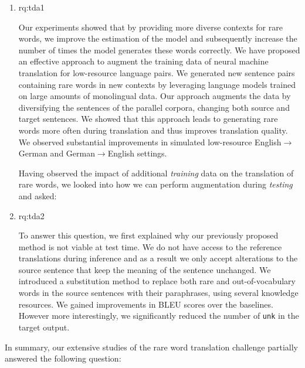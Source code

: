 \begin{enumerate}[label=\textbf{RQ2.\arabic* },wide = 0pt, leftmargin=2em]
\setlength\itemsep{1em}
\item \acl{rq:tda1}

\medskip

\noindent  Our experiments showed that by providing more diverse contexts for rare words, we improve the estimation of the model and subsequently increase the number of times the model generates these words correctly. 
We have proposed an effective approach to augment the training data of neural machine translation for low-resource language pairs. 
We generated new sentence pairs containing rare words in new contexts by leveraging language models trained on large amounts of monolingual data.
Our approach augments the data by diversifying the sentences of the parallel corpora, changing both source and target sentences.
We showed that this approach leads to generating rare words more often during translation and thus improves translation quality. 
We observed substantial improvements in simulated low-resource English$\rightarrow$German and German$\rightarrow$English settings.

 \noindent Having observed the impact of additional \textit{training} data on the translation of rare words, we looked into how we can perform augmentation during \textit{testing} and asked: 

\item \acl{rq:tda2}

\medskip

\noindent To answer this question, we first explained why our previously proposed method is not viable at test time.  
We do not have access to the reference translations during inference and as a result we only accept alterations to the source sentence that keep the meaning of the sentence unchanged.
We introduced a substitution method to replace both rare and out-of-vocabulary words in the source sentences with their paraphrases, using several knowledge resources.
We gained improvements in BLEU scores over the baselines.
However more interestingly, we significantly reduced the number of \texttt{unk} in the target output. 


\end{enumerate}

 \noindent In summary, our extensive studies of the rare word translation challenge partially answered the following question:


